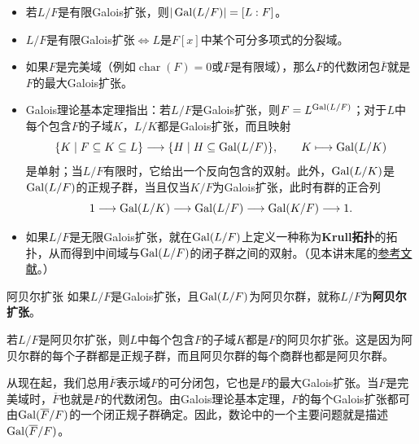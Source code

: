 \begin{property}
\begin{itemize}
\item 若$L/F$是有限Galois扩张，则$|\operatorname{Gal}(L/F)|=[L:F]$。
\item $L/F$是有限Galois扩张$\iff L$是$F[x]$中某个可分多项式的分裂域。
\item 如果$F$是完美域（例如$\operatorname{char}(F)=0$或$F$是有限域），那么$F$的代数闭包$\overline F$就是$F$的最大Galois扩张。
\item Galois理论基本定理指出：若$L/F$是Galois扩张，则$F=L^{\operatorname{Gal}(L/F)}$；对于$L$中每个包含$F$的子域$K$，$L/K$都是Galois扩张，而且映射
\[
\{K\mid F\subseteq K\subseteq L\}\longrightarrow\{H\mid H\subseteq\operatorname{Gal}(L/F)\},\qquad K\longmapsto\operatorname{Gal}(L/K)
\]
是单射；当$L/F$有限时，它给出一个反向包含的双射。此外，$\operatorname{Gal}(L/K)$是$\operatorname{Gal}(L/F)$的正规子群，当且仅当$K/F$为Galois扩张，此时有群的正合列
\[1\longrightarrow\operatorname{Gal}(L/K)\longrightarrow\operatorname{Gal}(L/F)\longrightarrow\operatorname{Gal}(K/F)\longrightarrow1.\]
\item 如果$L/F$是无限Galois扩张，就在$\operatorname{Gal}(L/F)$上定义一种称为\textbf{Krull拓扑}的拓扑，从而得到中间域与$\operatorname{Gal}(L/F)$的闭子群之间的双射。（见本讲末尾的\hyperref[L1S3]{参考文献}。）
\end{itemize}
\end{property}
\begin{definition*}{阿贝尔扩张}
如果$L/F$是Galois扩张，且$\operatorname{Gal}(L/F)$为阿贝尔群，就称$L/F$为\textbf{阿贝尔扩张}。
\end{definition*}
\begin{property}若$L/F$是阿贝尔扩张，则$L$中每个包含$F$的子域$K$都是$F$的阿贝尔扩张。这是因为阿贝尔群的每个子群都是正规子群，而且阿贝尔群的每个商群也都是阿贝尔群。\end{property}
从现在起，我们总用$\overline F$表示域$F$的可分闭包，它也是$F$的最大Galois扩张。当$F$是完美域时，$\overline F$也就是$F$的代数闭包。由Galois理论基本定理，$F$的每个Galois扩张都可由$\operatorname{Gal}(\overline F/F)$的一个闭正规子群确定。因此，数论中的一个主要问题就是描述$\operatorname{Gal}(\overline F/F)$。
